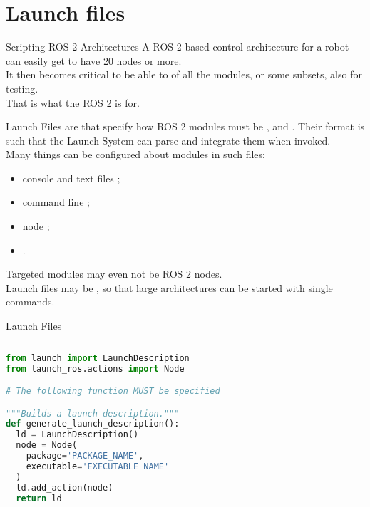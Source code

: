 
\section{Launch files}

\begin{frame}{Scripting ROS 2 Architectures}
A ROS 2-based control architecture for a robot can easily get to have 20 nodes or more.\\\vspace{10pt}
It then becomes critical to be able to  of all the modules, or some subsets, also for testing.\\\vspace{10pt}
That is what the ROS 2  is for.
\end{frame}

\begin{frame}{Launch Files}
 are  that specify how ROS 2 modules must be ,  and . Their format is such that the Launch System can parse and integrate them when invoked.\\\vspace{10pt}
Many things can be configured about modules in such files:
\begin{itemize}
  \item console and text files ;
  \item command line ;
  \item node ;
  \item {}.
\end{itemize}
\vspace{10pt}
Targeted modules may even not be ROS 2 nodes.\\\vspace{10pt}
Launch files may be , so that large architectures can be started with single commands.
\end{frame}
\begin{frame}[fragile]{Launch Files}
\begin{columns}
\begin{lstlisting}[language=Python, caption=Minimal example of a launch file]
from launch import LaunchDescription
from launch_ros.actions import Node

# The following function MUST be specified

"""Builds a launch description."""
def generate_launch_description():
  ld = LaunchDescription()
  node = Node(
    package='PACKAGE_NAME',
    executable='EXECUTABLE_NAME'
  )
  ld.add_action(node)
  return ld
\end{lstlisting}
\end{columns}
\end{frame}

